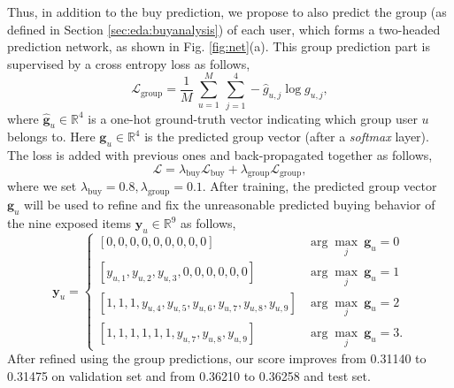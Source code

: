 Thus, in addition to the buy prediction, we propose to also predict the group (as defined in Section \ref{sec:eda:buyanalysis}) of each user, which forms a two-headed prediction network, as shown in Fig. \ref{fig:net}(a).
%
This group prediction part is supervised by a cross entropy loss as follows,
\begin{equation}
    \mathcal{L}_{\text{group}} = \frac{1}{M} ~\overset{M}{\underset{u=1}{\sum}}
    ~\overset{4}{\underset{j=1}{\sum}}
    - \hat{g}_{u,j} \log g_{u,j},
\end{equation}
where $\mathbf{\hat{g}}_{u} \in \mathbb{R}^4$ is a one-hot ground-truth vector indicating which group user $u$ belongs to. Here $\mathbf{g}_u \in \mathbb{R}^4$ is the predicted group vector (after a \textit{softmax} layer).
The loss is added with previous ones and back-propagated together as follows,
\begin{equation}
    \mathcal{L} = 
    \lambda_{\text{buy}} \mathcal{L}_{\text{buy}} + 
    \lambda_{\text{group}} \mathcal{L}_{\text{group}},
\end{equation}
where we set $\lambda_{\text{buy}}=0.8, \lambda_{\text{group}}=0.1$. 
%
After training, the predicted group vector $\mathbf{g}_u$ will be used to refine and fix the unreasonable predicted buying behavior of the nine exposed items $\mathbf{y}_{u} \in \mathbb{R}^{9}$ as follows,
\small
\begin{equation}\label{eqn:refine}
    \mathbf{y}_{u} = 
    \begin{cases}
        [0,0,0, 0,0,0, 0,0,0] & \arg\underset{j}{\max}~\mathbf{g}_{u}=0\\
        [y_{u,1},y_{u,2},y_{u,3}, 0,0,0, 0,0,0] & \arg\underset{j}{\max}~\mathbf{g}_{u}=1\\
        [1,1,1, y_{u,4},y_{u,5},y_{u,6}, y_{u,7},y_{u,8},y_{u,9}] & \arg\underset{j}{\max}~\mathbf{g}_{u}=2\\
        [1,1,1, 1,1,1, y_{u,7},y_{u,8},y_{u,9}] & \arg\underset{j}{\max}~\mathbf{g}_{u}=3.
    \end{cases}
\end{equation}
\normalsize
After refined using the group predictions, our score improves from 0.31140 to 0.31475 on validation set and from 0.36210 to 0.36258 and test set.



